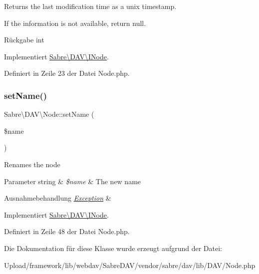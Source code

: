 Returns the last modification time as a unix timestamp.

If the information is not available, return null.

\begin{DoxyReturn}{Rückgabe}
int 
\end{DoxyReturn}


Implementiert \mbox{\hyperlink{interface_sabre_1_1_d_a_v_1_1_i_node_a06335f81c7d4ec2c6d9e327c8ce61014}{Sabre\textbackslash{}\+D\+A\+V\textbackslash{}\+I\+Node}}.



Definiert in Zeile 23 der Datei Node.\+php.

\mbox{\label{class_sabre_1_1_d_a_v_1_1_node_a1d029db9c2900104c89d1493ffa9199d}} 
\subsubsection{\texorpdfstring{set\+Name()}{setName()}}
{\footnotesize\ttfamily Sabre\textbackslash{}\+D\+A\+V\textbackslash{}\+Node\+::set\+Name (\begin{DoxyParamCaption}\item[{}]{\$name }\end{DoxyParamCaption})}

Renames the node


\begin{DoxyParams}[1]{Parameter}
string & {\em \$name} & The new name \\
\hline
\end{DoxyParams}

\begin{DoxyExceptions}{Ausnahmebehandlung}
{\em \mbox{\hyperlink{class_sabre_1_1_d_a_v_1_1_exception}{Exception}}} & \\
\hline
\end{DoxyExceptions}


Implementiert \mbox{\hyperlink{interface_sabre_1_1_d_a_v_1_1_i_node_ac90fa5526e98def2e1f51bc57a772366}{Sabre\textbackslash{}\+D\+A\+V\textbackslash{}\+I\+Node}}.



Definiert in Zeile 48 der Datei Node.\+php.



Die Dokumentation für diese Klasse wurde erzeugt aufgrund der Datei\+:\begin{DoxyCompactItemize}
\item 
Upload/framework/lib/webdav/\+Sabre\+D\+A\+V/vendor/sabre/dav/lib/\+D\+A\+V/Node.\+php\end{DoxyCompactItemize}
